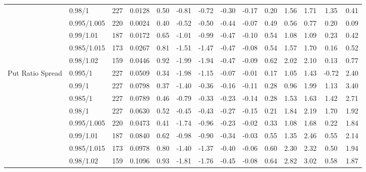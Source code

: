 \begin{tabular}{llcccccccccccc}
 & 0.98/1 & 227 & 0.0128 & 0.50 & -0.81 & -0.72 & -0.30 & -0.17 & 0.20 & 1.56 & 1.71 & 1.35 & 0.41 \\
 & 0.995/1.005 & 220 & 0.0024 & 0.40 & -0.52 & -0.50 & -0.44 & -0.07 & 0.49 & 0.56 & 0.77 & 0.20 & 0.09 \\
 & 0.99/1.01 & 187 & 0.0172 & 0.65 & -1.01 & -0.99 & -0.47 & -0.10 & 0.54 & 1.08 & 1.09 & 0.23 & 0.42 \\
 & 0.985/1.015 & 173 & 0.0267 & 0.81 & -1.51 & -1.47 & -0.47 & -0.08 & 0.54 & 1.57 & 1.70 & 0.16 & 0.52 \\
 & 0.98/1.02 & 159 & 0.0446 & 0.92 & -1.99 & -1.94 & -0.47 & -0.09 & 0.62 & 2.02 & 2.10 & 0.13 & 0.77 \\
Put Ratio Spread & 0.995/1 & 227 & 0.0509 & 0.34 & -1.98 & -1.15 & -0.07 & -0.01 & 0.17 & 1.05 & 1.43 & -0.72 & 2.40 \\
 & 0.99/1 & 227 & 0.0798 & 0.37 & -1.40 & -0.36 & -0.16 & -0.11 & 0.28 & 0.96 & 1.99 & 1.13 & 3.40 \\
 & 0.985/1 & 227 & 0.0789 & 0.46 & -0.79 & -0.33 & -0.23 & -0.14 & 0.28 & 1.53 & 1.63 & 1.42 & 2.71 \\
 & 0.98/1 & 227 & 0.0630 & 0.52 & -0.45 & -0.43 & -0.27 & -0.15 & 0.21 & 1.84 & 2.19 & 1.70 & 1.92 \\
 & 0.995/1.005 & 220 & 0.0473 & 0.41 & -1.74 & -0.96 & -0.23 & -0.02 & 0.33 & 1.08 & 1.68 & 0.22 & 1.84 \\
 & 0.99/1.01 & 187 & 0.0840 & 0.62 & -0.98 & -0.90 & -0.34 & -0.03 & 0.55 & 1.35 & 2.46 & 0.55 & 2.14 \\
 & 0.985/1.015 & 173 & 0.0978 & 0.80 & -1.40 & -1.37 & -0.40 & -0.06 & 0.60 & 2.30 & 2.32 & 0.50 & 1.94 \\
 & 0.98/1.02 & 159 & 0.1096 & 0.93 & -1.81 & -1.76 & -0.45 & -0.08 & 0.64 & 2.82 & 3.02 & 0.58 & 1.87 \\
\bottomrule
\end{tabular}

